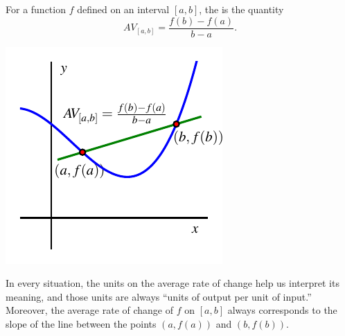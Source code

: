\documentclass[nooutcomes]{ximera}
\begin{document}
\begin{definition}
For a function $f$ defined on an interval $[a,b]$, the  is the quantity%
\begin{equation*}
AV_{[a,b]} = \frac{f(b) - f(a)}{b-a}\text{.}
\end{equation*}

\begin{image}
\includegraphics{aroc-f-x-defn.pdf}
\end{image}

\end{definition}
In every situation, the units on the average rate of change help us interpret its meaning, and those units are always ``units of output per unit of input.''   Moreover, the average rate of change of $f$ on $[a,b]$ always corresponds to the slope of the line between the points $(a,f(a))$ and $(b,f(b))$.
\end{document}
